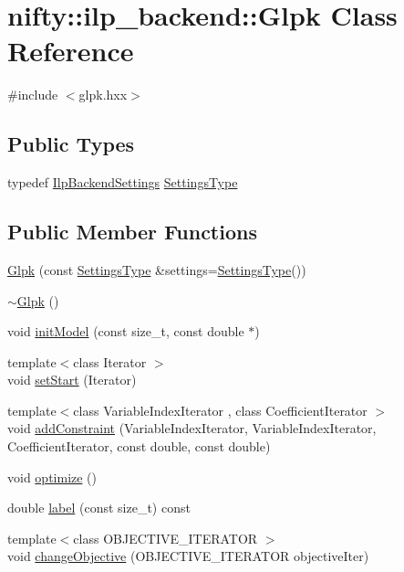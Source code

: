 \hypertarget{classnifty_1_1ilp__backend_1_1Glpk}{}\section{nifty\+:\+:ilp\+\_\+backend\+:\+:Glpk Class Reference}
\label{classnifty_1_1ilp__backend_1_1Glpk}


{\ttfamily \#include $<$glpk.\+hxx$>$}

\subsection*{Public Types}
\begin{DoxyCompactItemize}
\item 
typedef \hyperlink{structnifty_1_1ilp__backend_1_1IlpBackendSettings}{Ilp\+Backend\+Settings} \hyperlink{classnifty_1_1ilp__backend_1_1Glpk_a8f3191eb733e6a2f08f82adceae32365}{Settings\+Type}
\end{DoxyCompactItemize}
\subsection*{Public Member Functions}
\begin{DoxyCompactItemize}
\item 
\hyperlink{classnifty_1_1ilp__backend_1_1Glpk_a31b71a008ab6c3c16e60a17fbfc8822d}{Glpk} (const \hyperlink{classnifty_1_1ilp__backend_1_1Glpk_a8f3191eb733e6a2f08f82adceae32365}{Settings\+Type} \&settings=\hyperlink{classnifty_1_1ilp__backend_1_1Glpk_a8f3191eb733e6a2f08f82adceae32365}{Settings\+Type}())
\item 
\hyperlink{classnifty_1_1ilp__backend_1_1Glpk_a9696f83fd9a1688bcdf5a05b84c03976}{$\sim$\+Glpk} ()
\item 
void \hyperlink{classnifty_1_1ilp__backend_1_1Glpk_a82a16f1598798e5935d4b56a692d3b5a}{init\+Model} (const size\+\_\+t, const double $\ast$)
\item 
{\footnotesize template$<$class Iterator $>$ }\\void \hyperlink{classnifty_1_1ilp__backend_1_1Glpk_a7d71ee633ecc892e6d2e904a30604394}{set\+Start} (Iterator)
\item 
{\footnotesize template$<$class Variable\+Index\+Iterator , class Coefficient\+Iterator $>$ }\\void \hyperlink{classnifty_1_1ilp__backend_1_1Glpk_a756aac8075dfd7957e0b90e27f1b141d}{add\+Constraint} (Variable\+Index\+Iterator, Variable\+Index\+Iterator, Coefficient\+Iterator, const double, const double)
\item 
void \hyperlink{classnifty_1_1ilp__backend_1_1Glpk_a2e66c98281cb549ee477d58fbd3b8374}{optimize} ()
\item 
double \hyperlink{classnifty_1_1ilp__backend_1_1Glpk_a37396f440ddcda1e15b6486ed48642e1}{label} (const size\+\_\+t) const 
\item 
{\footnotesize template$<$class O\+B\+J\+E\+C\+T\+I\+V\+E\+\_\+\+I\+T\+E\+R\+A\+T\+O\+R $>$ }\\void \hyperlink{classnifty_1_1ilp__backend_1_1Glpk_a31c379a5553eb4fd87a56e71ac589a80}{change\+Objective} (O\+B\+J\+E\+C\+T\+I\+V\+E\+\_\+\+I\+T\+E\+R\+A\+T\+O\+R objective\+Iter)
\end{DoxyCompactItemize}
